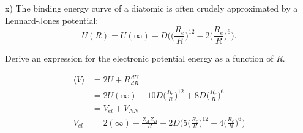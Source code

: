 \documentclass{article}
\begin{document}
\noindent x) The binding energy curve of a diatomic is often crudely approximated by a
Lennard-Jones potential:
\begin{equation*}
  U(R) = U(\infty) +D\Bigg(\Bigg(\frac{R_e}{R}\Bigg)^{12} - 2\Bigg(\frac{R_e}{R}\Bigg)^6\Bigg).
\end{equation*}

Derive an expression for the electronic potential energy as a function of $R$.

{\color{blue}
  \begin{align*}
    \langle V \rangle & = 2U + R\frac{dU}{dR} \\
    & = 2U(\infty) - 10D\Bigg(\frac{R_e}{R}\Bigg)^{12} + 8D\Bigg(\frac{R_e}{R}\Bigg)^6 \\
    & = V_{el} + V_{NN} \\
    V_{el} & = 2(\infty) -\frac{Z_AZ_B}{R} -2D\Bigg(5\Bigg(\frac{R_e}{R}\Bigg)^{12}-4\Bigg(\frac{R_e}{R}\Bigg)^6\Bigg)
  \end{align*}
}
\end{document}
